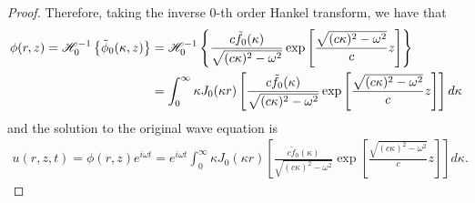 \begin{proof}
  Therefore, taking the inverse 0-th order Hankel transform, we have that
  \begin{align*}
    \phi(r, z) = \mathscr{H}^{-1}_{ {0} }\left\{ {\tilde{\phi}_0(\kappa, z)} \right\}
    &= \mathscr{H}^{-1}_{ {0} }\left\{ {\frac{c\tilde{f}_0(\kappa)}{\sqrt{(c\kappa)^2-\omega^2}}\exp\left[\frac{\sqrt{(c\kappa)^2-\omega^2}}{c} z\right]} \right\} \\
    &= \int_0^\infty \kappa J_0(\kappa r)\left[\frac{c\tilde{f}_0(\kappa)}{\sqrt{(c\kappa)^2-\omega^2}}\exp\left[\frac{\sqrt{(c\kappa)^2-\omega^2}}{c} z\right]\right] d\kappa
  \end{align*}
  and the solution to the original wave equation is
  \begin{align*}
    u(r, z, t) = \phi(r, z)e^{i \omega t} = e^{i\omega t}\int_0^\infty \kappa J_0(\kappa r)\left[\frac{c\tilde{f}_0(\kappa)}{\sqrt{(c\kappa)^2-\omega^2}}\exp\left[\frac{\sqrt{(c\kappa)^2-\omega^2}}{c} z\right]\right] d\kappa.
  \end{align*}
\end{proof}
\newpage
